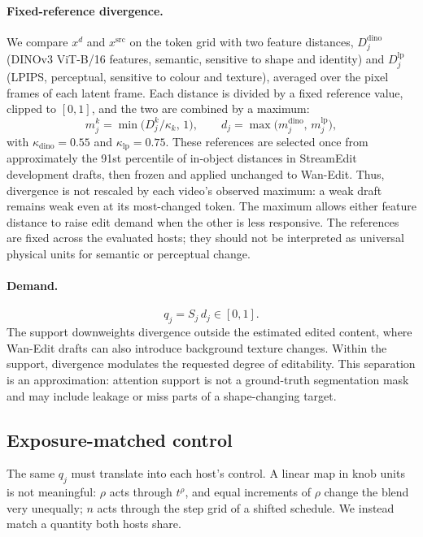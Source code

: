 \documentclass[10pt,twocolumn]{article}
\newcommand{\src}{\mathrm{src}}
\begin{document}
\paragraph{Fixed-reference divergence.}
We compare $x^{d}$ and $x^{\src}$ on the token grid with two feature distances, $D^{\mathrm{dino}}_j$ (DINOv3 ViT-B/16 features, semantic, sensitive to shape and identity) and $D^{\mathrm{lp}}_j$ (LPIPS, perceptual, sensitive to colour and texture), averaged over the pixel frames of each latent frame. Each distance is divided by a fixed reference value, clipped to $[0,1]$, and the two are combined by a maximum:
\begin{equation}
m^{k}_j = \min\!\big(D^{k}_j/\kappa_k,\,1\big),\qquad d_j = \max\big(m^{\mathrm{dino}}_j,\, m^{\mathrm{lp}}_j\big),
\end{equation}
with $\kappa_{\mathrm{dino}}=0.55$ and $\kappa_{\mathrm{lp}}=0.75$. These references are selected once from approximately the 91st percentile of in-object distances in StreamEdit development drafts, then frozen and applied unchanged to Wan-Edit. Thus, divergence is not rescaled by each video's observed maximum: a weak draft remains weak even at its most-changed token. The maximum allows either feature distance to raise edit demand when the other is less responsive. The references are fixed across the evaluated hosts; they should not be interpreted as universal physical units for semantic or perceptual change.

\paragraph{Demand.}
\begin{equation}
q_j = S_j\, d_j \in [0,1].
\end{equation}
The support downweights divergence outside the estimated edited content, where Wan-Edit drafts can also introduce background texture changes. Within the support, divergence modulates the requested degree of editability. This separation is an approximation: attention support is not a ground-truth segmentation mask and may include leakage or miss parts of a shape-changing target.

\subsection{Exposure-matched control}
\label{sec:exposure}

The same $q_j$ must translate into each host's control. A linear map in knob units is not meaningful: $\rho$ acts through $t^{\rho}$, and equal increments of $\rho$ change the blend very unequally; $n$ acts through the step grid of a shifted schedule. We instead match a quantity both hosts share.
\end{document}
